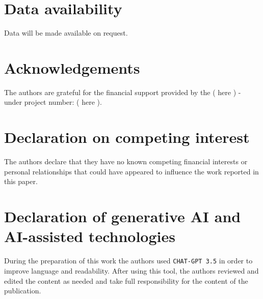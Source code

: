 \documentclass[11pt]{article}
\begin{document}
\section*{Data availability}

\noindent Data will be made available on request.

\section*{Acknowledgements}

\noindent The authors are grateful for the financial support provided by the ( here ) - under project number: ( here ).

\section*{Declaration on competing interest}

\noindent The authors declare that they have no known competing financial interests or personal relationships that could have appeared to influence the work reported in this paper.

\section*{Declaration of generative AI and AI-assisted technologies}

\noindent During the preparation of this work the authors used \texttt{CHAT-GPT 3.5} in order to improve language and readability. After using this tool, the authors reviewed and edited the content as needed and take full responsibility for the content of the publication.
	
\end{document}
